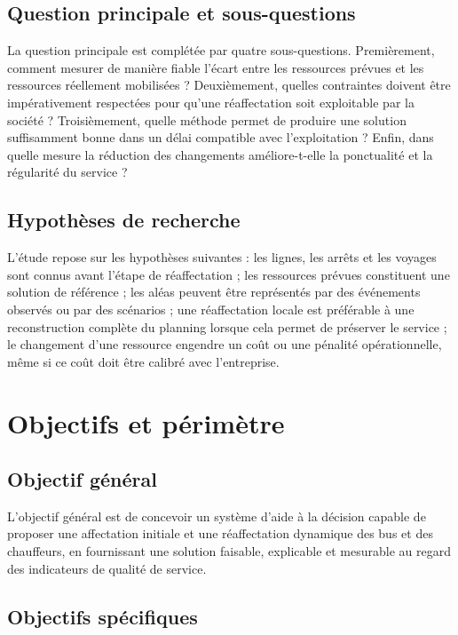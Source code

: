 \documentclass[12pt,a4paper]{article}
\begin{document}
\subsection{Question principale et sous-questions}

La question principale est complétée par quatre sous-questions. Premièrement, comment mesurer de manière fiable l’écart entre les ressources prévues et les ressources réellement mobilisées ? Deuxièmement, quelles contraintes doivent être impérativement respectées pour qu’une réaffectation soit exploitable par la société ? Troisièmement, quelle méthode permet de produire une solution suffisamment bonne dans un délai compatible avec l’exploitation ? Enfin, dans quelle mesure la réduction des changements améliore-t-elle la ponctualité et la régularité du service ?

\subsection{Hypothèses de recherche}

L’étude repose sur les hypothèses suivantes : les lignes, les arrêts et les voyages sont connus avant l’étape de réaffectation ; les ressources prévues constituent une solution de référence ; les aléas peuvent être représentés par des événements observés ou par des scénarios ; une réaffectation locale est préférable à une reconstruction complète du planning lorsque cela permet de préserver le service ; le changement d’une ressource engendre un coût ou une pénalité opérationnelle, même si ce coût doit être calibré avec l’entreprise.

\section{Objectifs et périmètre}

\subsection{Objectif général}

L’objectif général est de concevoir un système d’aide à la décision capable de proposer une affectation initiale et une réaffectation dynamique des bus et des chauffeurs, en fournissant une solution faisable, explicable et mesurable au regard des indicateurs de qualité de service.

\subsection{Objectifs spécifiques}
\end{document}
